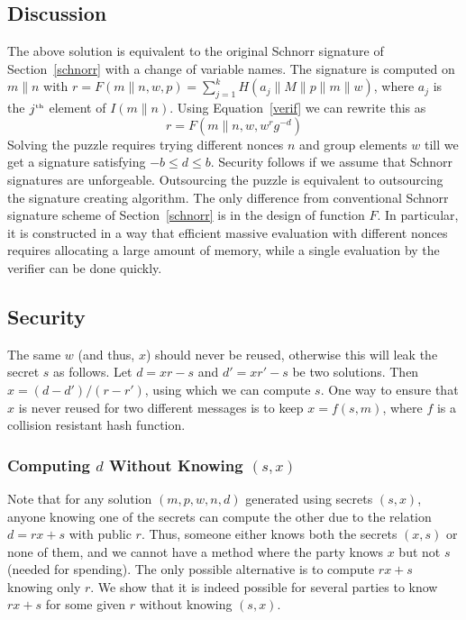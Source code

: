 \documentclass[11pt]{article}
\begin{document}
\subsection{Discussion}
\label{impl}
The above solution is equivalent to the original Schnorr signature of Section~\ref{schnorr} with a change of variable names. 
The signature is computed on ${m\|n}$ with 
$r = F({m\|n},w,{p}) = \sum^{k}_{j=1}H(a_j\|M\|{p}\|m\|w)$, where $a_j$ is the $j^{\tiny\mbox{th}}$ element of ${I}(m\|n)$.
Using Equation~\ref{verif} 
we can rewrite this as 
\begin{equation}\label{eqn2}
r = F(m\|n,w,w^rg^{-d})
\end{equation}
Solving the puzzle requires trying different nonces $n$ and group elements $w$ till we get a signature satisfying $-b\leq d \leq b$. 
Security follows if we assume that Schnorr signatures are unforgeable. Outsourcing the puzzle is equivalent to outsourcing the signature creating algorithm. The only difference from conventional Schnorr signature scheme of Section~\ref{schnorr} is in the design of function $F$. In particular, it is constructed in a way that efficient massive evaluation with different nonces requires allocating a large amount of memory, while a single evaluation by the verifier can be done quickly.

\subsection{Security} 
The same $w$ (and thus, $x$) should never be reused, otherwise this will leak the secret ${s}$ as follows. Let $d = xr-{s}$ and $d' = xr'-{s}$ be two solutions. Then $x = (d-d')/(r-r')$, using which we can compute $s$. One way to ensure that $x$ is never reused for two different messages is to keep $x = f(s, m)$, where $f$ is a collision resistant hash function.

\subsubsection{Computing $d$ Without Knowing $(s, x)$}

Note that for any solution $(m, p, w, n, d)$ generated using secrets $(s, x)$, anyone knowing one of the secrets can compute the other due to the relation $d = rx+s$ with public $r$. Thus, someone either knows both the secrets $(x, s)$ or none of them, and we cannot have a method where the party knows $x$ but not $s$ (needed for spending). The only possible alternative is to compute $rx+s$ knowing only $r$. 
We show that it is indeed possible for several parties to know $rx+s$ for some given $r$ without knowing $(s, x)$. 
\end{document}
